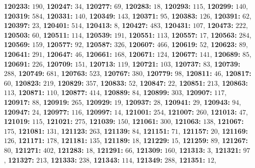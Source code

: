 \textsf{\bfseries 120233:} $190$, \textsf{\bfseries 120247:} $34$, \textsf{\bfseries 120277:} $69$, \textsf{\bfseries 120283:} $18$, \textsf{\bfseries 120293:} $115$, \textsf{\bfseries 120299:} $140$, \textsf{\bfseries 120319:} $584$, \textsf{\bfseries 120331:} $140$, \textsf{\bfseries 120349:} $143$, \textsf{\bfseries 120371:} $95$, \textsf{\bfseries 120383:} $126$, \textsf{\bfseries 120391:} $62$, \textsf{\bfseries 120397:} $23$, \textsf{\bfseries 120401:} $514$, \textsf{\bfseries 120413:} $8$, \textsf{\bfseries 120427:} $483$, \textsf{\bfseries 120431:} $107$, \textsf{\bfseries 120473:} $222$, \textsf{\bfseries 120503:} $60$, \textsf{\bfseries 120511:} $114$, \textsf{\bfseries 120539:} $191$, \textsf{\bfseries 120551:} $113$, \textsf{\bfseries 120557:} $17$, \textsf{\bfseries 120563:} $284$, \textsf{\bfseries 120569:} $159$, \textsf{\bfseries 120577:} $92$, \textsf{\bfseries 120587:} $326$, \textsf{\bfseries 120607:} $466$, \textsf{\bfseries 120619:} $52$, \textsf{\bfseries 120623:} $89$, \textsf{\bfseries 120641:} $291$, \textsf{\bfseries 120647:} $46$, \textsf{\bfseries 120661:} $168$, \textsf{\bfseries 120671:} $124$, \textsf{\bfseries 120677:} $141$, \textsf{\bfseries 120689:} $85$, \textsf{\bfseries 120691:} $226$, \textsf{\bfseries 120709:} $151$, \textsf{\bfseries 120713:} $119$, \textsf{\bfseries 120721:} $103$, \textsf{\bfseries 120737:} $83$, \textsf{\bfseries 120739:} $288$, \textsf{\bfseries 120749:} $681$, \textsf{\bfseries 120763:} $523$, \textsf{\bfseries 120767:} $380$, \textsf{\bfseries 120779:} $98$, \textsf{\bfseries 120811:} $46$, \textsf{\bfseries 120817:} $60$, \textsf{\bfseries 120823:} $219$, \textsf{\bfseries 120829:} $357$, \textsf{\bfseries 120833:} $52$, \textsf{\bfseries 120847:} $22$, \textsf{\bfseries 120851:} $213$, \textsf{\bfseries 120863:} $113$, \textsf{\bfseries 120871:} $110$, \textsf{\bfseries 120877:} $414$, \textsf{\bfseries 120889:} $84$, \textsf{\bfseries 120899:} $303$, \textsf{\bfseries 120907:} $117$, \textsf{\bfseries 120917:} $88$, \textsf{\bfseries 120919:} $265$, \textsf{\bfseries 120929:} $19$, \textsf{\bfseries 120937:} $28$, \textsf{\bfseries 120941:} $29$, \textsf{\bfseries 120943:} $94$, \textsf{\bfseries 120947:} $24$, \textsf{\bfseries 120977:} $116$, \textsf{\bfseries 120997:} $14$, \textsf{\bfseries 121001:} $254$, \textsf{\bfseries 121007:} $260$, \textsf{\bfseries 121013:} $47$, \textsf{\bfseries 121019:} $115$, \textsf{\bfseries 121021:} $275$, \textsf{\bfseries 121039:} $150$, \textsf{\bfseries 121061:} $300$, \textsf{\bfseries 121063:} $138$, \textsf{\bfseries 121067:} $175$, \textsf{\bfseries 121081:} $131$, \textsf{\bfseries 121123:} $263$, \textsf{\bfseries 121139:} $84$, \textsf{\bfseries 121151:} $71$, \textsf{\bfseries 121157:} $20$, \textsf{\bfseries 121169:} $126$, \textsf{\bfseries 121171:} $178$, \textsf{\bfseries 121181:} $135$, \textsf{\bfseries 121189:} $18$, \textsf{\bfseries 121229:} $15$, \textsf{\bfseries 121259:} $89$, \textsf{\bfseries 121267:} $80$, \textsf{\bfseries 121271:} $402$, \textsf{\bfseries 121283:} $18$, \textsf{\bfseries 121291:} $66$, \textsf{\bfseries 121309:} $160$, \textsf{\bfseries 121313:} $3$, \textsf{\bfseries 121321:} $97$, \textsf{\bfseries 121327:} $213$, \textsf{\bfseries 121333:} $238$, \textsf{\bfseries 121343:} $114$, \textsf{\bfseries 121349:} $288$, \textsf{\bfseries 121351:} $12$, 
